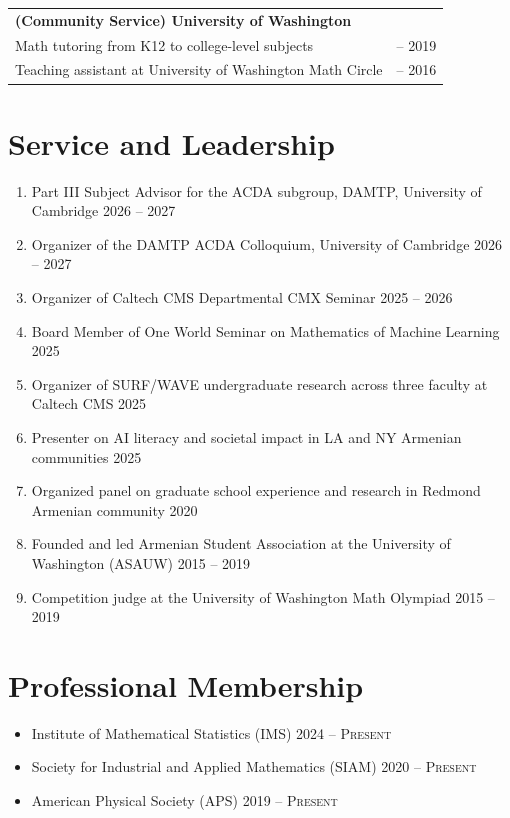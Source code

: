 \documentclass[a4paper,10pt]{article}
\newcommand{\faPaperclip}{{\ResumeLinkFont\symbol{"F0C6}}}
\begin{document}
\begin{tabularx}{\textwidth}{@{}X|>{\raggedleft\arraybackslash}p{2.2cm}@{}}
\textbf{(Community Service) University of Washington}\\
Math tutoring from K12 to college-level subjects & 2015 -- 2019\\
Teaching assistant at University of Washington Math Circle & 2015 -- 2016\\
\end{tabularx}
\vspace{10pt}

\section{Service and Leadership}
\begin{enumerate}
  \item Part III Subject Advisor for the ACDA subgroup, DAMTP, University of Cambridge 2026 -- 2027
  \item Organizer of the DAMTP ACDA Colloquium, University of Cambridge 2026 -- 2027 \href{\detokenize{https://talks.cam.ac.uk/show/index/9811/}}{\faPaperclip}
  \item Organizer of Caltech CMS Departmental CMX Seminar 2025 -- 2026
  \item Board Member of One World Seminar on Mathematics of Machine Learning 2025 \href{\detokenize{https://sites.google.com/view/oneworldml}}{\faPaperclip}
  \item Organizer of SURF/WAVE undergraduate research across three faculty at Caltech CMS 2025
  \item Presenter on AI literacy and societal impact in LA and NY Armenian communities 2025
  \item Organized panel on graduate school experience and research in Redmond Armenian community 2020
  \item Founded and led Armenian Student Association at the University of Washington (ASAUW) 2015 -- 2019
  \item Competition judge at the University of Washington Math Olympiad 2015 -- 2019
\end{enumerate}
\vspace{10pt}

\section{Professional Membership}
\begin{itemize}
  \item Institute of Mathematical Statistics (IMS) 2024 -- \textsc{Present}
  \item Society for Industrial and Applied Mathematics (SIAM) 2020 -- \textsc{Present}
  \item American Physical Society (APS) 2019 -- \textsc{Present}
\end{itemize}
\vspace{10pt}
\end{document}
